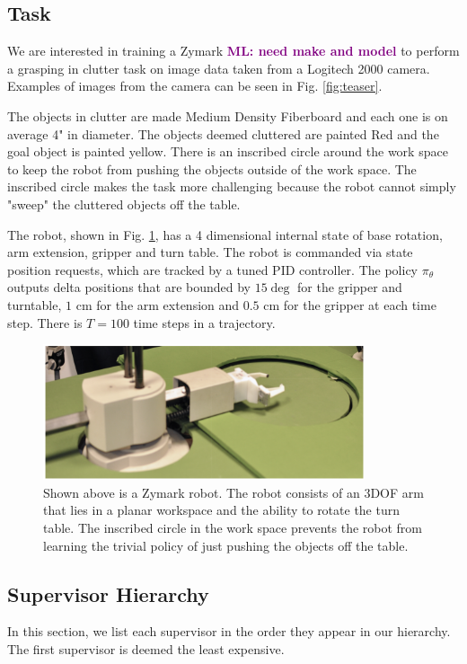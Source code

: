 \documentclass[10pt, conference]{ieeeconf}      %
\newcommand{\mlnote}[1]{\ifthenelse{ \boolean{include-notes}}%
 {\textcolor{purple}{\textbf{ML: #1}}}{}}
\begin{document}
\subsection{Task}
We are interested in training a Zymark \mlnote{need make and model} to perform a grasping in clutter task on image data taken from a Logitech 2000 camera. Examples of images from the camera can be seen in Fig. \ref{fig:teaser}.

The objects in clutter are made Medium Density Fiberboard and each one is on average 4" in diameter. The objects deemed cluttered are painted Red and the goal object is painted yellow. There is an inscribed circle around the work space to keep the robot from pushing the objects outside of the work space. The inscribed circle makes the task more challenging because the robot cannot simply "sweep" the cluttered objects off the table. 

The robot, shown in Fig. \ref{fig:robot}, has a 4 dimensional internal state of base rotation, arm extension, gripper and turn table. The robot is commanded via state position requests, which are tracked by a tuned PID controller. The policy $\pi_\theta$ outputs delta positions that are bounded by $15\deg$ for the gripper and turntable, $1$ cm for the arm extension and $0.5$ cm for the gripper at each time step. There is $T=100$ time steps in a trajectory. 

\begin{figure}[t!]
\centering
\includegraphics[width=\columnwidth, height=4cm]{f_figs/robot.pdf}
\caption{ \footnotesize Shown above is a Zymark robot. The robot consists of an 3DOF arm that lies in a planar workspace and the ability to rotate the turn table. The inscribed circle in the work space prevents the robot from learning the trivial policy of just pushing the objects off the table.}
\vspace*{-10pt}
\label{fig:robot}
\end{figure}


\subsection{Supervisor Hierarchy}
In this section, we list each supervisor in the order they appear in our hierarchy. The first supervisor is deemed the least expensive. 
\end{document}
